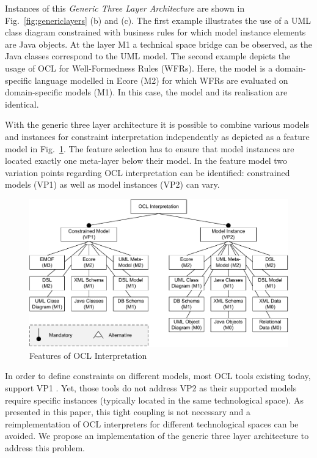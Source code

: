 Instances of this \emph{Generic Three Layer Architecture} are shown in Fig.~\ref{fig:genericlayers} 
(b) and (c). The first example illustrates the use of a UML class diagram constrained with business
rules for which model instance
elements are Java objects. At the layer M1 a technical space bridge can be observed, as the Java
classes correspond to the UML model. The second example depicts the usage of OCL for Well-Formedness
Rules (WFRs). Here, the model is a domain-specific language modelled in Ecore (M2) for which WFRs are
evaluated on domain-specific models (M1). In this case, the model and its realisation are identical.

With the generic three layer architecture it is possible to combine various models and instances for
constraint interpretation independently as depicted as a feature model in Fig.~\ref{fig:features}. 
The feature selection has to ensure that model
instances are located exactly one meta-layer below their model. In the feature model two variation
points regarding OCL interpretation can be identified: constrained models (VP1) as well as
model instances (VP2) can vary.

	\begin{figure}[t]
			\centering
		  \includegraphics[width=1.00\textwidth]{figures/features.pdf}
			\caption{Features of OCL Interpretation}
			\label{fig:features}
	\end{figure}
	
In order to define constraints on different models, most OCL tools existing today, support VP1 
\cite{WWW:MDT,akehurst2003ocl,WWW:dresdenOCL,kolovos2008detecting}. Yet, those tools do not address
VP2 as their supported models require specific instances (typically located in the same technological
space). As presented in this paper, this tight coupling is not necessary and a reimplementation of
OCL interpreters for different technological spaces can be avoided.
We propose an implementation of the generic three layer architecture to address this problem.

